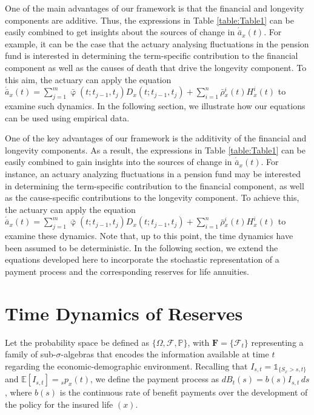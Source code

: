 \documentclass[12pt]{article}
\begin{document}
One of the main advantages of our framework is that the financial and longevity components are additive. Thus, the expressions in Table \ref{table:Table1} can be easily combined to get insights about the sources of change in $\acute{\bar{a}}_x(t)$. For example, it can be the case that the actuary analysing fluctuations in the pension fund is interested in determining the term-specific contribution to the financial component as well as the causes of death that drive the longevity component. To this aim, the actuary can apply the equation $\acute{\bar{a}}_x(t)=\sum_{j=1}^m\bar{\upvarphi}(t;t_{j-1},t_{j}){D}_x(t;t_{j-1},t_{j})+\sum_{i=1}^{n} \bar{\rho}{^i_x}(t){H}^{i}_x(t)$ to examine such dynamics. In the following section, we illustrate how our equations can be used using empirical data.


One of the key advantages of our framework is the additivity of the financial and longevity components. As a result, the expressions in Table \ref{table:Table1} can be easily combined to gain insights into the sources of change in $\acute{\bar{a}}_x(t)$. For instance, an actuary analyzing fluctuations in a pension fund may be interested in determining the term-specific contribution to the financial component, as well as the cause-specific contributions to the longevity component. To achieve this, the actuary can apply the equation 
$\acute{\bar{a}}_x(t)=\sum_{j=1}^m\bar{\upvarphi}(t;t_{j-1},t_{j}){D}_x(t;t_{j-1},t_{j})+\sum_{i=1}^{n} \bar{\rho}{^i_x}(t){H}^{i}_x(t)$ to examine these dynamics. Note that, up to this point, the time dynamics have been assumed to be deterministic. In the following section, we extend the equations developed here to incorporate the stochastic representation of a payment process and the corresponding reserves for life annuities.


\FloatBarrier
\section{Time Dynamics of Reserves}\label{sec:Reserves}


Let the probability space be defined as \( \{\Omega, \mathcal{F}, \mathbb{P}\} \), with \(\textbf{F} = \{\mathcal{F}_t\}\) representing a family of sub-\(\sigma\)-algebras that encodes the information available at time \( t \) regarding the economic-demographic environment. Recalling that \( I_{s,t} = \mathds{1}_{\{S_x > s, t\}} \) and \( \mathbb{E}[I_{s,t}] = {}_s p_x(t) \), we define the payment process as \( dB_t(s) = b(s) I_{s,t} \, ds \), where \( b(s) \) is the continuous rate of benefit payments over the development of the policy for the insured life \( (x) \).
\end{document}
